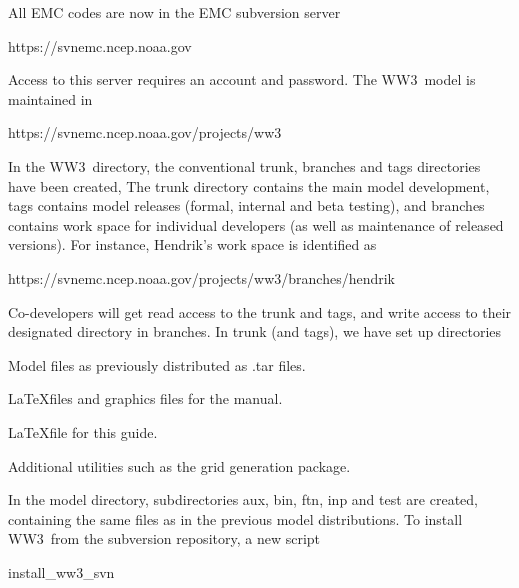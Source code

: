 \documentclass[12pt]{article}
\newcommand{\ws}{WW3}
\newcommand{\file}{\sf}
\newenvironment{flist}{\begin{list}{nofile ?}{\parsep 0mm
            \itemsep 0mm \leftmargin 35mm \labelwidth 25mm
            \rightmargin 10mm}}{\end{list}}
\newcommand{\fit}[2]{\item[{\file{#1}}\hfill]{#2}}
\begin{document}
\vspace{\baselineskip} \noindent
All EMC codes are now in the EMC subversion server

\vspace{\baselineskip}
\centerline{\file https://svnemc.ncep.noaa.gov}
\vspace{\baselineskip}

\noindent
Access to this server requires an account and password. The \ws\ model is
maintained in

\vspace{\baselineskip}
\centerline{\file https://svnemc.ncep.noaa.gov/projects/ww3}
\vspace{\baselineskip}

\noindent
In the \ws\ directory, the conventional {\file trunk}, {\file branches} and
{\file tags} directories have been created, The {\file trunk} directory
contains the main model development, {\file tags} contains model releases
(formal, internal and beta testing), and {\file branches} contains work space
for individual developers (as well as maintenance of released versions). For
instance, Hendrik's work space is identified as

\vspace{\baselineskip}
\centerline{\file https://svnemc.ncep.noaa.gov/projects/ww3/branches/hendrik}
\vspace{\baselineskip}

\noindent
Co-developers will get read access to the {\file trunk} and {\file tags}, and
write access to their designated directory in {\file branches}. In {\file
trunk} (and {\file tags}), we have set up directories

\begin{flist}
\fit{model }{Model files as previously distributed as {\file .tar} files.}
\fit{manual}{\LaTeX files and graphics files for the manual.}
\fit{guide }{\LaTeX file for this guide.}
\fit{utilities}{Additional utilities such as the grid generation package.}
\end{flist}

\noindent
In the {\file model} directory, subdirectories {\file aux}, {\file bin},
{\file ftn}, {\file inp} and {\file test} are created, containing the same
files as in the previous model distributions. To install \ws\ from the
subversion repository, a new script

\vspace{\baselineskip}
\centerline{\file install\_ww3\_svn}
\vspace{\baselineskip}
\end{document}
